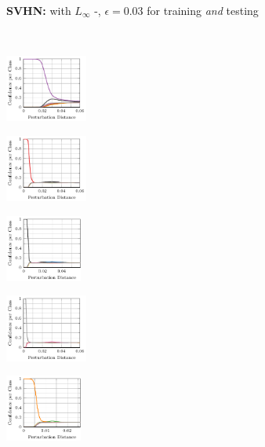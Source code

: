 \begin{figure}[t]
\begin{subfigure}{1\textwidth}
        \centering
        \textbf{SVHN:} \textbf{\ConfTrain} with $L_\infty$ \PGD-\FConf, $\epsilon = 0.03$ for training \emph{and} testing
    \end{subfigure}\\[4px]
    \begin{subfigure}{0.19\textwidth}
        \includegraphics[height=2.2cm]{fig_svhn_ours10_0_adversarial}
    \end{subfigure}
    \begin{subfigure}{0.19\textwidth}
        \includegraphics[height=2.2cm]{fig_svhn_ours10_1_adversarial}
    \end{subfigure}
    \begin{subfigure}{0.19\textwidth}
        \includegraphics[height=2.2cm]{fig_svhn_ours10_2_adversarial}
    \end{subfigure}
    \begin{subfigure}{0.19\textwidth}
        \includegraphics[height=2.2cm]{fig_svhn_ours10_3_adversarial}
    \end{subfigure}
    \begin{subfigure}{0.19\textwidth}
        \includegraphics[height=2.2cm]{fig_svhn_ours10_4_adversarial}
    \end{subfigure}

\end{figure}
